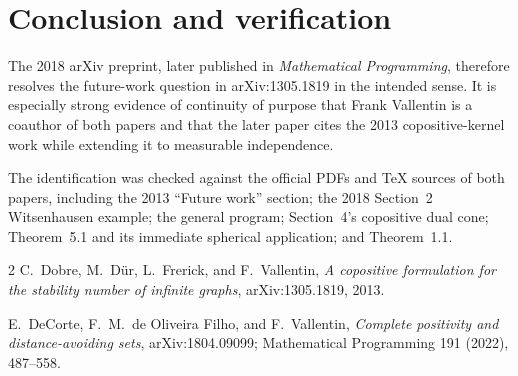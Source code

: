 \documentclass[11pt]{article}
\begin{document}
\section{Conclusion and verification}

The 2018 arXiv preprint, later published in \emph{Mathematical Programming},
therefore resolves the future-work question in arXiv:1305.1819 in the intended
sense.  It is especially strong evidence of continuity of purpose that Frank
Vallentin is a coauthor of both papers and that the later paper cites the 2013
copositive-kernel work while extending it to measurable independence.

The identification was checked against the official PDFs and TeX sources of
both papers, including the 2013 ``Future work'' section; the 2018 Section~2
Witsenhausen example; the general program; Section~4's copositive dual cone;
Theorem~5.1 and its immediate spherical application; and Theorem~1.1.

\begin{thebibliography}{2}
C.~Dobre, M.~D\"ur, L.~Frerick, and F.~Vallentin,
\emph{A copositive formulation for the stability number of infinite graphs},
arXiv:1305.1819, 2013.

E.~DeCorte, F.~M.~de Oliveira Filho, and F.~Vallentin,
\emph{Complete positivity and distance-avoiding sets},
arXiv:1804.09099; Mathematical Programming 191 (2022), 487--558.
\end{thebibliography}
\end{document}
